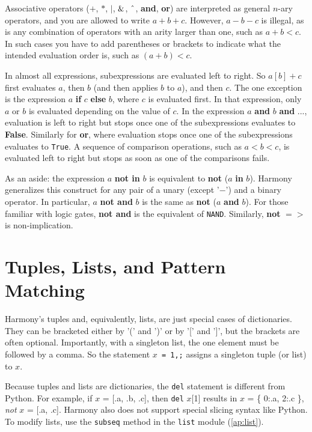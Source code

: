\documentclass{report}
\begin{document}
Associative operators ($+$, $*$, $|$, $\string&$, $\string^$, \textbf{and}, \textbf{or})
are interpreted as general $n$-ary operators, and you are allowed to write
$a + b + c$.  However, $a - b - c$ is illegal, as is any combination of operators with an
arity larger than one, such as $a + b < c$.
In such cases you have to add parentheses or brackets to indicate what
the intended evaluation order is, such as $(a + b) < c$.

In almost all expressions, subexpressions are evaluated left to right.  So $a[b] + c$
first evaluates $a$, then $b$ (and then applies $b$ to $a$), and then $c$.  The one
exception is the expression $a$ \textbf{if} $c$ \textbf{else} $b$, where $c$ is evaluated
first.  In that expression, only $a$ or $b$ is evaluated depending on the value of $c$.
In the expression $a$ \textbf{and} $b$ \textbf{and} $...$, evaluation is left
to right but stops once one of the subexpressions evaluates to \textbf{False}.
Similarly for \textbf{or}, where evaluation stops once one of the subexpressions
evaluates to \texttt{True}.
A sequence of comparison operations, such as $a < b < c$, is evaluated left to right
but stops as soon as one of the comparisons fails.

As an aside:
the expression $a$ \textbf{not in} $b$ is equivalent to \textbf{not} ($a$ \textbf{in} $b$).
Harmony generalizes this construct for any pair of a unary (except '$-$') and a binary operator.
In particular, $a$ \textbf{not and} $b$ is the same as \textbf{not} ($a$ \textbf{and} $b$).  
For those familiar with logic gates, \textbf{not and} is the equivalent of \texttt{NAND}.
Similarly, \textbf{not} \texttt{$=>$} is non-implication.

\section{Tuples, Lists, and Pattern Matching}

Harmony's tuples and, equivalently, lists, are just special cases of dictionaries.
They can be bracketed either by '(' and ')' or by '[' and ']', but
the brackets are often optional.  Importantly, with a singleton list, the
one element must be followed by a comma.
So the statement \texttt{$x$ = 1,;} assigns a singleton tuple (or list) to $x$.

Because tuples and lists are dictionaries, the \texttt{del} statement is
different from Python.  For example, if $x$ = [.a, .b, .c], then
\texttt{del} $x$[1] results in $x$ = \{ 0:.a, 2:.c \}, \emph{not}
$x$ = [.a, .c].
Harmony also does not support special slicing syntax like Python.
To modify lists, use the \texttt{subseq} method in the \texttt{list} module
(\autoref{ap:list}).
\end{document}
